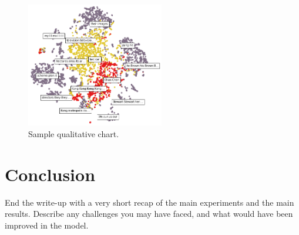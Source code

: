 \documentclass[11pt]{article}
\begin{document}
\begin{figure}
  \centering
  \includegraphics[width=6cm]{cluster_viz}
  \caption{\label{fig:clusters} Sample qualitative chart.}
\end{figure}


\section{Conclusion}

End the write-up with a very short recap of the main experiments and the main results. Describe any challenges you may have faced, and what would have been improved in the model. 

 

\end{document}
